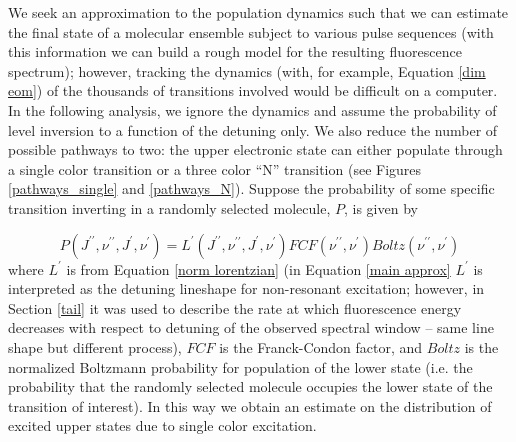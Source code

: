 \label{approx section}
We seek an approximation to the population dynamics such that we can estimate the final state of a molecular ensemble subject to various pulse sequences (with this information we can build a rough model for the resulting fluorescence spectrum); however, tracking the dynamics (with, for example, Equation \ref{dim eom}) of the thousands of transitions involved would be difficult on a computer. In the following analysis, we ignore the dynamics and assume the probability of level inversion to a function of the detuning only. We also reduce the number of possible pathways to two: the upper electronic state can either populate through a single color transition or a three color ``N'' transition (see Figures \ref{pathways_single} and \ref{pathways_N}). Suppose the probability of some specific transition inverting in a randomly selected molecule, $P$, is given by


\begin{equation}
P(J^{\prime\prime},\nu^{\prime\prime},J^{\prime},\nu^{\prime})
=
L^{\prime}(J^{\prime\prime},\nu^{\prime\prime},J^{\prime},\nu^{\prime})
FCF(\nu^{\prime\prime},\nu^{\prime})
Boltz(\nu^{\prime\prime},\nu^{\prime})
\label{main approx}
\end{equation}
where $L^{\prime}$ is from Equation \ref{norm lorentzian} (in Equation \ref{main approx} $L^{\prime}$ is interpreted as the detuning lineshape for non-resonant excitation; however, in Section \ref{tail} it was used to describe the rate at which fluorescence energy decreases with respect to detuning of the observed spectral window -- same line shape but different process), $FCF$ is the Franck-Condon factor, and $Boltz$ is the normalized Boltzmann probability for population of the lower state (i.e. the probability that the randomly selected molecule occupies the lower state of the transition of interest). In this way we obtain an estimate on the distribution of excited upper states due to single color excitation.

